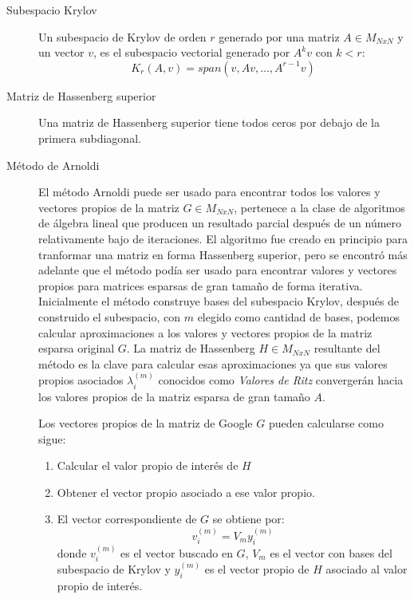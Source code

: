 \documentclass{article}
\begin{document}
\begin{description}
\item[Subespacio Krylov] Un subespacio de Krylov de orden $r$ generado por una matriz $A \in M_{NxN}$ y un vector $v$, es el subespacio vectorial generado por $A^{k}v$ con $k < r$:
\begin{equation} \label{eq:KY}
K_{r}(A,v) = span(v,Av,\ldots,A^{r-1}v)
\end{equation}

\item[Matriz de Hassenberg superior] Una matriz de Hassenberg superior tiene todos ceros por debajo de la primera subdiagonal.

 
\item[Método de Arnoldi] El método Arnoldi puede ser usado para encontrar todos los valores y vectores propios de la matriz $G \in M_{NxN}$, pertenece a la clase de algoritmos de álgebra lineal que producen un resultado parcial después de un número relativamente bajo de iteraciones. El algoritmo fue creado en principio para tranformar una matriz en forma Hassenberg superior, pero se encontró más adelante que el método podía ser usado para encontrar valores y vectores propios para matrices esparsas de gran tamaño de forma iterativa. Inicialmente el método construye bases del subespacio Krylov, después de construido el subespacio, con $m$ elegido como cantidad de bases, podemos calcular aproximaciones a los valores y vectores propios de la matriz esparsa original $G$. La matriz de Hassenberg $H \in M_{NxN}$ resultante del método es la clave para calcular esas aproximaciones ya que sus valores propios asociados $\lambda _{i}^{(m)}$ conocidos como \textit{Valores de Ritz} convergerán hacia los valores propios de la matriz esparsa de gran tamaño $A$.

Los vectores propios de la matriz de Google $G$ pueden calcularse como sigue:

\begin{enumerate}
  \item Calcular el valor propio de interés de $H$
  \item Obtener el vector propio asociado a ese valor propio.
  \item El vector correspondiente de $G$ se obtiene por:
  \begin{equation} \label{eq:SL}
	v_{i}^{(m)} = V_{m}y_{i}^{(m)}
\end{equation}
donde $v_{i}^{(m)}$ es el vector buscado en $G$, $V_{m}$ es el vector con bases del subespacio de Krylov y $y_{i}^{(m)}$ es el vector propio de $H$ asociado al valor propio de interés.   
  
\end{enumerate}



\end{description}
\end{document}
